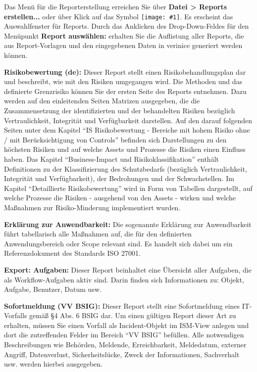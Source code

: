 \documentclass[a4paper,10pt]{book}
\newcommand{\icon}[1]{\texttt{[image: \#1]}}
\begin{document}
Das Menü für die Reporterstellung erreichen Sie über \textbf{Datei \textgreater
Reports erstellen...} oder über Klick auf das Symbol
\icon{Icon/Report.png}. Es erscheint das Auswahlfenster
für Reports. Durch das Anklicken des Drop-Down-Feldes für den Menüpunkt
\textbf{Report auswählen:} erhalten Sie die Auflistung aller Reports, die aus
Report-Vorlagen und den eingegebenen Daten in verinice generiert werden können.

\textbf{Risikobewertung (de):} Dieser Report stellt einen Risikobehandlungsplan
dar und beschreibt, wie mit den Risiken umgegangen wird. Die Methoden und das
definierte Grenzrisiko können Sie der ersten Seite des Reports entnehmen. Dazu
werden auf den einleitenden Seiten Matrizen ausgegeben, die die Zusammensetzung
der identifizierten und der behandelten Risiken bezüglich Vertraulichkeit,
Integrität und Verfügbarkeit darstellen. Auf den darauf folgenden Seiten unter
dem Kapitel ``IS Risikobewertung - Bereiche mit hohem Risiko ohne / mit
Berücksichtigung von Controls'' befinden sich Darstellungen zu den höchsten
Risiken und auf welche Assets und Prozesse die Risiken einen Einfluss haben. Das
Kapitel ``Business-Impact und Risikoklassifikation'' enthält Definitionen zu der
Klassifizierung des Schutzbedarfs (bezüglich Vertraulichkeit, Integrität und
Verfügbarkeit), der Bedrohungen und der Schwachstellen. Im Kapitel
``Detaillierte Risikobewertung'' wird in Form von Tabellen dargestellt, auf
welche Prozesse die Risiken - ausgehend von den Assets - wirken und welche
Maßnahmen zur Risiko-Minderung implementiert wurden.

\textbf{Erklärung zur Anwendbarkeit:} Die sogenannte Erklärung zur Anwendbarkeit
führt tabellarisch alle Maßnahmen auf, die für den definierten Anwendungsbereich
oder Scope relevant sind. Es handelt sich dabei um ein Referenzdokument des
Standards ISO 27001.


\textbf{Export: Aufgaben:} Dieser Report beinhaltet eine Übersicht aller
Aufgaben, die als Workflow-Aufgaben aktiv sind. Darin finden sich Informationen
zu: Objekt, Aufgabe, Benutzer, Datum usw.

\textbf{Sofortmeldung (VV BSIG):} Dieser Report stellt eine Sofortmeldung eines
IT-Vorfalls gemäß §4 Abs. 6 BSIG dar. Um einen gültigen Report dieser Art zu
erhalten, müssen Sie einen Vorfall als Incident-Objekt im ISM-View anlegen und
dort die zutreffenden Felder im Bereich ``VV BSIG'' befüllen. Alle notwendigen
Beschreibungen wie Behörden, Meldende, Erreichbarkeit, Meldedatum, externer
Angriff, Datenverlust, Sicherheitslücke, Zweck der Informationen, Sachverhalt
usw. werden hierbei ausgegeben.
\end{document}
